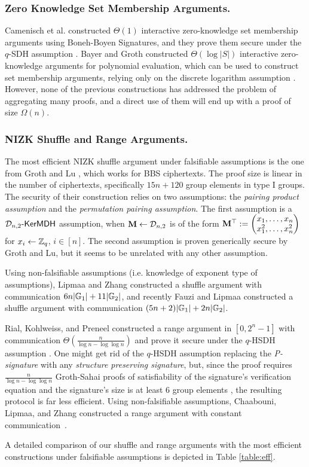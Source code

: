 \subsubsection{Zero Knowledge Set Membership Arguments.}
Camenisch et al. constructed $\Theta(1)$ interactive zero-knowledge set membership arguments using Boneh-Boyen Signatures, and they prove them secure under the $q$-SDH assumption \cite{AC:CamChaShe08}. Bayer and Groth constructed $\Theta(\log |S|)$ interactive zero-knowledge arguments for polynomial evaluation, which can be used to construct set membership arguments, relying only on the discrete logarithm assumption \cite{EC:BayGro13}.
However, none of the previous constructions has addressed the problem of aggregating many proofs, and a direct use of them will end up with a proof of size $\Omega(n)$.

\subsubsection{NIZK Shuffle and Range Arguments.}
The most efficient NIZK shuffle argument under falsifiable assumptions is the one from Groth and Lu \cite{AC:GroLu07}, which works for BBS ciphertexts. The proof size is linear in the number of ciphertexts, specifically $15n + 120$ group elements in type I groups. The security of their construction relies on two assumptions: the \emph{pairing product assumption} and the \emph{permutation pairing assumption}. The first assumption is a $\mathcal{D}_{n,2}\mbox{-}\mathsf{KerMDH}$ assumption, when $\mathbf{{M}}\gets\mathcal{D}_{n,2}$ is of the form $\mathbf{{M}}^\top:=\left(\begin{matrix}x_1,\ldots,x_n\\x_1^2,\ldots,x_n^2\end{matrix}\right)$ for $x_i\gets\mathbb{Z}_q$, $i\in[n]$. The second assumption is proven generically secure by Groth and Lu, but it seems to be unrelated with any other assumption.

Using non-falsifiable assumptions (i.e. knowledge of exponent type of assumptions), Lipmaa and Zhang \cite{SCN:LipZha12} constructed a shuffle argument with communication $6n|\mathbb{G}_1|+11|\mathbb{G}_2|$, and recently Fauzi and Lipmaa  \cite{EPRINT:FauLip15} constructed a shuffle argument with communication $(5n+2)|\mathbb{G}_1|+2n|\mathbb{G}_2|$.

Rial, Kohlweiss, and Preneel constructed a range argument in $[0,2^n-1]$ with communication $\Theta(\frac{n}{\log n -\log\log n})$ and prove it secure under the $q$-HSDH assumption \cite{PAIRING:RiaKohPre09}. One might get rid of the $q$-HSDH assumption replacing the \emph{P-signature} with any \emph{structure preserving signature}, but, since the proof requires $\frac{n}{\log n-\log \log n}$ Groth-Sahai proofs of satisfiability of the signature's verification equation and the signature's size is at least 6 group elements \cite{EPRINT:JutRoy17}, the resulting protocol is far less efficient.
Using non-falsifiable assumptions, Chaabouni, Lipmaa, and Zhang constructed a range argument with constant communication~\cite{FC:ChaLipZha12}. 

A detailed comparison of our shuffle and range arguments with the most efficient constructions under falsifiable assumptions is depicted in Table \ref{table:eff}.



